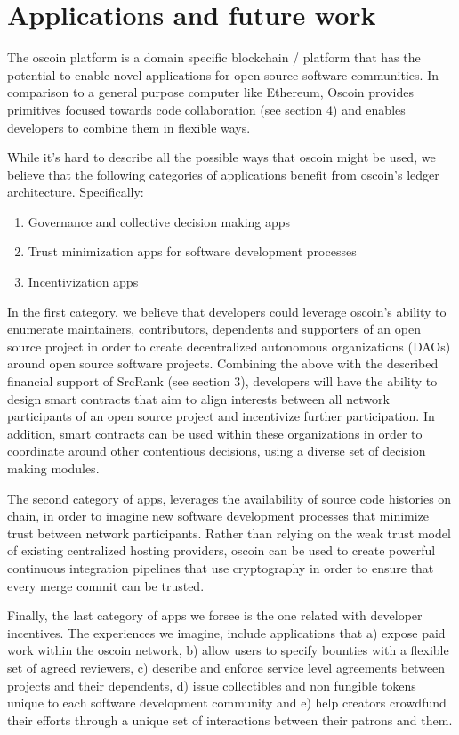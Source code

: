 \section{Applications and future work}

The oscoin platform is a domain specific blockchain / platform that has the
potential to enable novel applications for open source software communities. In
comparison to a general purpose computer like Ethereum, Oscoin provides
primitives focused towards code collaboration (see section 4) and enables
developers to combine them in flexible ways.

While it’s hard to describe all the possible ways that oscoin might be used, we
believe that the following categories of applications benefit from oscoin’s
ledger architecture. Specifically:

\begin{enumerate}
    \item Governance and collective decision making apps
    \item Trust minimization apps for software development processes
    \item Incentivization apps
\end{enumerate}

In the first category, we believe that developers could leverage oscoin’s
ability to enumerate maintainers, contributors, dependents and supporters of an
open source project in order to create decentralized autonomous organizations
(DAOs) around open source software projects. Combining the above with the
described financial support of SrcRank (see section 3), developers will have
the ability to design smart contracts that aim to align interests between all
network participants of an open source project and incentivize further
participation. In addition, smart contracts can be used within these
organizations in order to coordinate around other contentious decisions, using
a diverse set of decision making modules.

The second category of apps, leverages the availability of source code
histories on chain, in order to imagine new software development processes that
minimize trust between network participants. Rather than relying on the weak
trust model of existing centralized hosting providers, oscoin can be used to
create powerful continuous integration pipelines that use cryptography in order
to ensure that every merge commit can be trusted.

Finally, the last category of apps we forsee is the one related with
developer incentives. The experiences we imagine, include applications that a)
expose paid work within the oscoin network, b) allow users to specify bounties
with a flexible set of agreed reviewers, c) describe and enforce service level
agreements between projects and their dependents, d) issue collectibles and non
fungible tokens unique to each software development community and e) help
creators crowdfund their efforts through a unique set of interactions between
their patrons and them.
